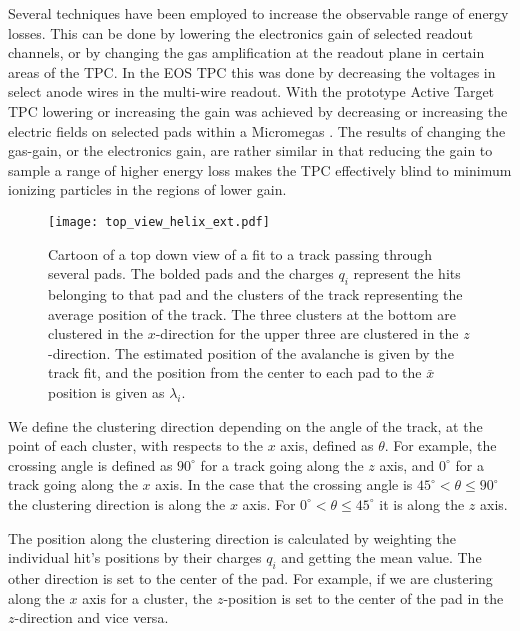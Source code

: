 Several techniques have been employed to increase the observable range of energy losses. This can be done by lowering the electronics gain of selected readout channels, or by changing the gas amplification at the readout plane in certain areas of the TPC. In the EOS TPC \cite{eos} this was done by decreasing the voltages in select anode wires in the multi-wire readout. With the prototype Active Target TPC lowering or increasing the gain was achieved by decreasing or increasing the electric fields on selected pads within a Micromegas \cite{pattpc}. The results of changing the gas-gain, or the electronics gain, are rather similar in that reducing the gain to sample a range of higher energy loss makes the TPC effectively blind to minimum ionizing particles in  the regions of lower gain.




\begin{figure}[ht!]
\texttt{[image: top\_view\_helix\_ext.pdf]}
\caption{Cartoon of a top down view of a fit to a track passing through several pads. The bolded pads and the charges $q_i$ represent the hits belonging to that pad and the clusters of the track representing the average position of the track. The three clusters at the bottom are clustered in the $x$-direction for the upper three are clustered in the $z$-direction. The estimated position of the avalanche is given by the track fit, and the position from the center to each pad to the $\bar{x}$ position is given as $\lambda_i$.}
\label{fig:topview}
\end{figure}

We define the clustering direction depending on the angle of the track, at the point of each cluster, with respects to the $x$ axis, defined as $\theta$. For example, the crossing angle is defined as $90^{\circ}$ for a track going along the $z$ axis, and $0^{\circ}$ for a track going along the $x$ axis. In the case that the crossing angle is $45^{\circ} < \theta \leq 90^{\circ} $ the clustering direction is along the $x$ axis. For $0^{\circ} < \theta \leq 45^{\circ}$ it is along the $z$ axis. 

 The position along the clustering direction is calculated by weighting the individual hit's positions by their charges $q_i$ and getting the mean value. The other direction is set to the center of the pad. For example, if we are clustering along the $x$ axis for a cluster, the $z$-position is set to the center of the pad in the $z$-direction and vice versa. 
 


